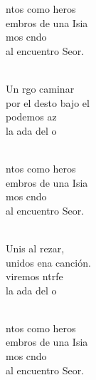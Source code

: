 \begin{cancion}%
	\begin{chorus}%
	ntos como heros\\
	embros de una Isia\\
	mos cndo\\
	al encuentro  Seor.\\
	\end{chorus}%
	\jump\\
	Un rgo caminar\\
	por el desto bajo el \\
	 podemos az\\
	 la ada del o \\\jump\\
	\begin{chorus}%
	ntos como heros\\
	embros de una Isia\\
	mos cndo\\
	al encuentro  Seor.\\
	\end{chorus}%
	\jump\\
	Unis al rezar,\\
	unidos ena canción. \\
	viremos ntrfe\\
	 la ada del o \\\jump\\
	\begin{chorus}%
	ntos como heros\\
	embros de una Isia\\
	mos cndo\\
	al encuentro  Seor.\\
	\end{chorus}%
	\jump\\

\end{cancion}
